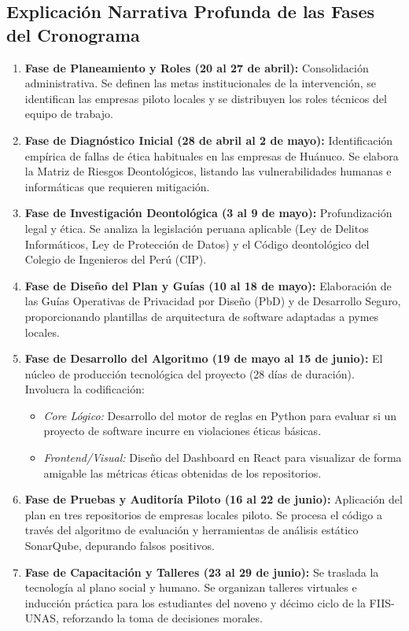 \documentclass[12pt,a4paper]{article}
\begin{document}
\subsection{Explicación Narrativa Profunda de las Fases del Cronograma}
\begin{enumerate}
    \item \textbf{Fase de Planeamiento y Roles (20 al 27 de abril):} Consolidación administrativa. Se definen las metas institucionales de la intervención, se identifican las empresas piloto locales y se distribuyen los roles técnicos del equipo de trabajo.
    \item \textbf{Fase de Diagnóstico Inicial (28 de abril al 2 de mayo):} Identificación empírica de fallas de ética habituales en las empresas de Huánuco. Se elabora la Matriz de Riesgos Deontológicos, listando las vulnerabilidades humanas e informáticas que requieren mitigación.
    \item \textbf{Fase de Investigación Deontológica (3 al 9 de mayo):} Profundización legal y ética. Se analiza la legislación peruana aplicable (Ley de Delitos Informáticos, Ley de Protección de Datos) y el Código deontológico del Colegio de Ingenieros del Perú (CIP).
    \item \textbf{Fase de Diseño del Plan y Guías (10 al 18 de mayo):} Elaboración de las Guías Operativas de Privacidad por Diseño (PbD) y de Desarrollo Seguro, proporcionando plantillas de arquitectura de software adaptadas a pymes locales.
    \item \textbf{Fase de Desarrollo del Algoritmo (19 de mayo al 15 de junio):} El núcleo de producción tecnológica del proyecto (28 días de duración). Involucra la codificación:
    \begin{itemize}
        \item \textit{Core Lógico:} Desarrollo del motor de reglas en Python para evaluar si un proyecto de software incurre en violaciones éticas básicas.
        \item \textit{Frontend/Visual:} Diseño del Dashboard en React para visualizar de forma amigable las métricas éticas obtenidas de los repositorios.
    \end{itemize}
    \item \textbf{Fase de Pruebas y Auditoría Piloto (16 al 22 de junio):} Aplicación del plan en tres repositorios de empresas locales piloto. Se procesa el código a través del algoritmo de evaluación y herramientas de análisis estático SonarQube, depurando falsos positivos.
    \item \textbf{Fase de Capacitación y Talleres (23 al 29 de junio):} Se traslada la tecnología al plano social y humano. Se organizan talleres virtuales e inducción práctica para los estudiantes del noveno y décimo ciclo de la FIIS-UNAS, reforzando la toma de decisiones morales.

\end{enumerate}
\end{document}
